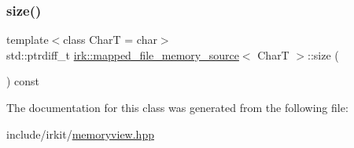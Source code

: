 \subsubsection{\texorpdfstring{size()}{size()}}
{\footnotesize\ttfamily template$<$class CharT  = char$>$ \\
std\+::ptrdiff\+\_\+t \mbox{\hyperlink{classirk_1_1mapped__file__memory__source}{irk\+::mapped\+\_\+file\+\_\+memory\+\_\+source}}$<$ CharT $>$\+::size (\begin{DoxyParamCaption}{ }\end{DoxyParamCaption}) const\hspace{0.3cm}{\ttfamily [inline]}}



The documentation for this class was generated from the following file\+:\begin{DoxyCompactItemize}
\item 
include/irkit/\mbox{\hyperlink{memoryview_8hpp}{memoryview.\+hpp}}\end{DoxyCompactItemize}
